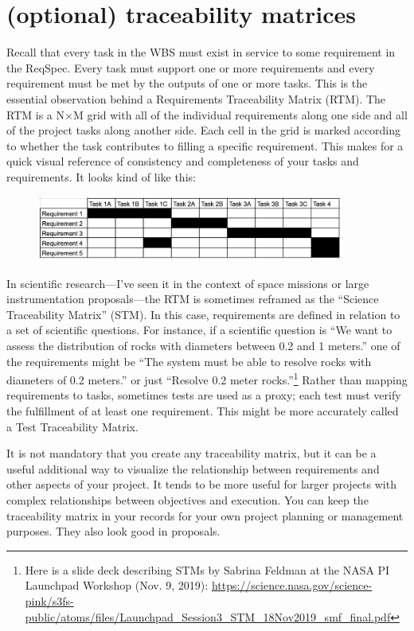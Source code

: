 \documentclass[12pt,oneside]{book}
\begin{document}
\newpage
{}
\section*{(optional) traceability matrices}

Recall that every task in the WBS must exist in service to some requirement in the ReqSpec. Every task must support one or more requirements and every requirement must be met by the outputs of one or more tasks. This is the essential observation behind a Requirements Traceability Matrix (RTM). The RTM is a N$\times$M grid with all of the individual requirements along one side and all of the project tasks along another side. Each cell in the grid is marked according to whether the task contributes to filling a specific requirement. This makes for a quick visual reference of consistency and completeness of your tasks and requirements. It looks kind of like this:

\begin{figure}[h]
\centering
\includegraphics[width=0.9\textwidth]{Task_Matrix_01.png}
\centering
\end{figure}

In scientific research---I've seen it in the context of space missions or large instrumentation proposals---the RTM is sometimes reframed as the ``Science Traceability Matrix'' (STM). In this case, requirements are defined in relation to a set of scientific questions. For instance, if a scientific question is ``We want to assess the distribution of rocks with diameters between 0.2 and 1 meters.'' one of the requirements might be ``The system must be able to resolve rocks with diameters of 0.2 meters.'' or just ``Resolve 0.2 meter rocks.''\footnote{Here is a slide deck describing STMs by Sabrina Feldman at the NASA PI Launchpad Workshop (Nov. 9, 2019): \url{https://science.nasa.gov/science-pink/s3fs-public/atoms/files/Launchpad_Session3_STM_18Nov2019_smf_final.pdf}} Rather than mapping requirements to tasks, sometimes tests are used as a proxy; each test must verify the fulfillment of at least one requirement. This might be more accurately called a Test Traceability Matrix.

It is not mandatory that you create any traceability matrix, but it can be a useful additional way to visualize the relationship between requirements and other aspects of your project. It tends to be more useful for larger projects with complex relationships between objectives and execution. You can keep the traceability matrix in your records for your own project planning or management purposes. They also look good in proposals.
\end{document}
